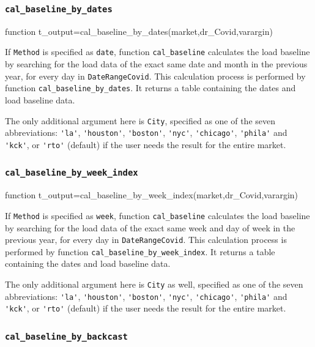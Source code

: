 \documentclass[10pt]{article}
\numberwithin{equation}{section}
\numberwithin{table}{section}
\numberwithin{figure}{section}
\begin{document}
\subsubsection{\texttt{cal\_baseline\_by\_dates}}\label{func:cal_baseline_by_dates}

\begin{Code}
function t_output=cal_baseline_by_dates(market,dr_Covid,varargin)
\end{Code}

If \verb!Method! is specified as \verb!date!, function \verb!cal_baseline! calculates the load baseline by searching for the load data of the exact same date and month in the previous year, for every day in \verb!DateRangeCovid!. This calculation process is performed by function \verb!cal_baseline_by_dates!. It returns a table containing the dates and load baseline data.

The only additional argument here is \verb!City!, specified as one of the seven abbreviations: \verb!'la'!,  \verb!'houston'!, \verb!'boston'!, \verb!'nyc'!, \verb!'chicago'!, \verb!'phila'! and \verb!'kck'!, or \verb!'rto'! (default) if the user needs the result for the entire market.



\subsubsection{\texttt{cal\_baseline\_by\_week\_index}}\label{func:cal_baseline_by_week_index}

\begin{Code}
function t_output=cal_baseline_by_week_index(market,dr_Covid,varargin)
\end{Code}

If \verb!Method! is specified as \verb!week!, function \verb!cal_baseline! calculates the load baseline by searching for the load data of the exact same week and day of week in the previous year, for every day in \verb!DateRangeCovid!. This calculation process is performed by function \verb!cal_baseline_by_week_index!. It returns a table containing the dates and load baseline data.

The only additional argument here is \verb!City! as well, specified as one of the seven abbreviations: \verb!'la'!,  \verb!'houston'!, \verb!'boston'!, \verb!'nyc'!, \verb!'chicago'!, \verb!'phila'! and \verb!'kck'!, or \verb!'rto'! (default) if the user needs the result for the entire market.



\subsubsection{\texttt{cal\_baseline\_by\_backcast}}\label{func:cal_baseline_by_backcast}
\end{document}
